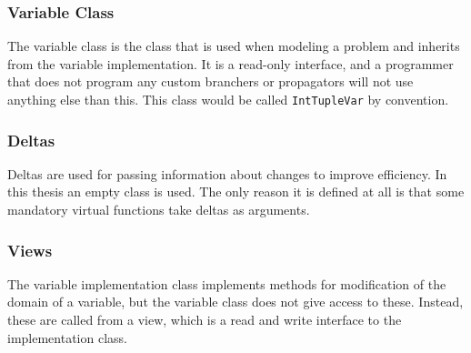 \documentclass[a4paper,11pt]{article}
\begin{document}
\subsubsection{Variable Class}
The variable class is the class that is used when modeling a problem and inherits from the variable implementation. It is a read-only interface, and a programmer that does not program any custom branchers or propagators will not use anything else than this. This class would be called \texttt{IntTupleVar} by convention.

\subsubsection{Deltas}
Deltas are used for passing information about changes to improve efficiency. In this thesis an empty class is used. The only reason it is defined at all is that some mandatory virtual functions take deltas as arguments.

\subsubsection{Views}
The variable implementation class implements methods for modification of the domain of a variable, but the variable class does not give access to these. Instead, these are called from a view, which is a read and write interface to the implementation class.
\end{document}
